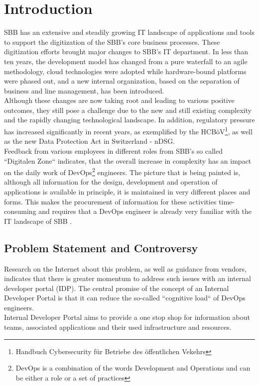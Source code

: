 \documentclass[a4paper,12pt]{article}
\begin{document}
    \section{Introduction}
    \label{sec:introduction}
    SBB has an extensive and steadily growing IT landscape of applications and tools to support the digitization of the
    SBB's core business processes.
    These digitization efforts brought major changes to SBB's IT department.
    In less than ten years, the development model has changed from a pure waterfall to an agile methodology,
    cloud technologies were adopted while hardware-bound platforms were phased out, and a new internal organization,
    based on the separation of business and line management, has been introduced.\\
    Although these changes are now taking root and leading to various positive outcomes, they still pose a challenge
    due to the new and still existing complexity and the rapidly changing technological landscape.
    In addition, regulatory pressure has increased significantly in recent years, as exemplified by the
    HCBöV\footnote{Handbuch Cybersecurity für Betriebe des öffentlichen Vekehrs}, as well as the new Data Protection Act
    in Switzerland - nDSG.\\
    Feedback from various employees in different roles from SBB's so called ``Digitalen Zone`` indicates, that the overall
    increase in complexity has an impact on the daily work of DevOps\footnote{DevOps is a combination of the words
    Development and Operations and can be either a role or a set of practices} engineers.
    The picture that is being painted is, although all information for the design, development and operation of
    applications is available in principle, it is maintained in very different places and forms.
    This makes the procurement of information for these activities time-consuming and requires that a DevOps
    engineer is already very familiar with the IT landscape of SBB .

    \subsection{Problem Statement and Controversy}
    \label{subsec:iproblemstatement}
    Research on the Internet about this problem, as well as guidance from vendors, indicates that there is greater momentum
    to address such issues with an internal developer portal (IDP). The central promise of the concept of an
    Internal Developer Portal is that it can reduce the so-called ``cognitive load`` of DevOps engineers.\\
    Internal Developer Portal aims to provide a one stop shop for information about teams, associated applications and
    their used infrastructure and resources.
\end{document}
